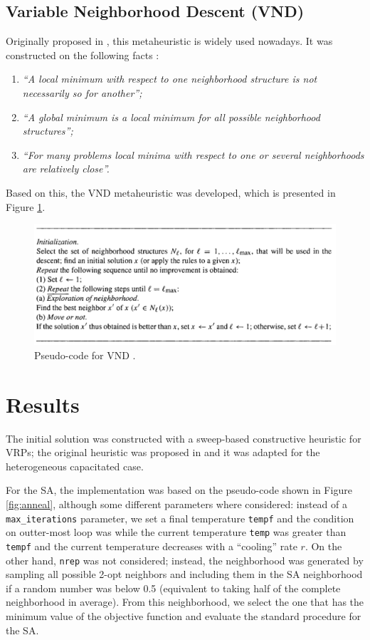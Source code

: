 \documentclass[10pt,twoside]{article}
\begin{document}
\subsection{Variable Neighborhood Descent (VND)}
Originally proposed in \cite{mladenovic1997variable}, this metaheuristic is widely used nowadays. It was constructed on the following facts \citep{mladenovic1997variable}:
\begin{enumerate}
    \item \textit{``A local minimum with respect to one neighborhood structure is not necessarily so for another'';}
    \item \textit{``A global minimum is a local minimum for all possible neighborhood structures'';}
    \item \textit{``For many problems local minima with respect to one or several neighborhoods are relatively close''.}
\end{enumerate}
Based on this, the VND metaheuristic was developed, which is presented in Figure \ref{fig:vnd}.

\begin{figure}[H]
    \centering
    \includegraphics[scale=0.8]{figs/vnd.png}
    \caption{Pseudo-code for VND \citep{mladenovic1997variable}.}
    \label{fig:vnd}
\end{figure}

\section{Results}
The initial solution was constructed with a sweep-based constructive heuristic for VRPs; the original heuristic was proposed in \cite{gillett1974heuristic} and it was adapted for the heterogeneous capacitated case.

For the SA, the implementation was based on the pseudo-code shown in Figure \ref{fig:anneal}, although some different parameters where considered: instead of a \texttt{max\_iterations} parameter, we set a final temperature \texttt{tempf} and the condition on outter-most loop was while the current temperature \texttt{temp} was greater than \texttt{tempf} and the current temperature decreases with a ``cooling'' rate $r$. On the other hand, \texttt{nrep} was not considered; instead, the neighborhood was generated by sampling all possible 2-opt neighbors and including them in the SA neighborhood if a random number was below 0.5 (equivalent to taking half of the complete neighborhood in average). From this neighborhood, we select the one that has the minimum value of the objective function and evaluate the standard procedure for the SA.
\end{document}
